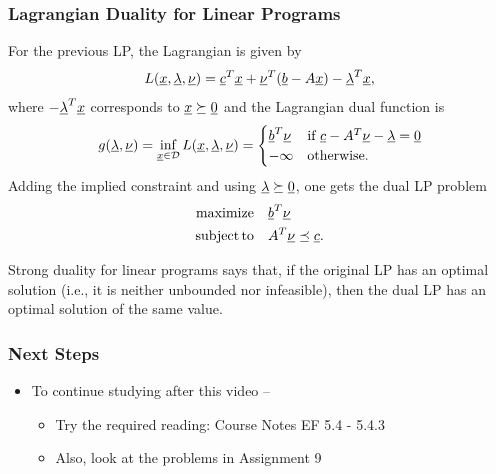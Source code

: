 \documentclass[10pt,english,aspectratio=169]{beamer}
\begin{document}
\begin{frame} \frametitle{Lagrangian Duality for Linear Programs}

For the previous LP, the Lagrangian is given by
	\[ L(\underline{x},\underline{\lambda},\underline{\nu}) = \underline{c}^T \underline{x} + \underline{\nu}^T (\underline{b} - A\underline{x}) - \underline{\lambda}^T \underline{x}, \]
	where $-\underline{\lambda}^T \underline{x}$ corresponds to $\underline{x} \succeq \underline{0}$ and the Lagrangian dual function is \vspace{-1.5mm}
\begin{equation*}
g(\underline{\lambda},\underline{\nu})
= \inf_{\underline{x}\in \mathcal{D}} L(\underline{x},\underline{\lambda},\underline{\nu})
	= \begin{cases} \underline{b}^T \underline{\nu} & \text{if } \underline{c} - A^T \underline{\nu} - \underline{\lambda} = \underline{0} \\
-\infty & \text{otherwise}. \end{cases}
\end{equation*}
Adding the implied constraint and using $\underline{\lambda} \succeq \underline{0}$, one gets the dual LP problem
\begin{align*}
\mathrm{maximize} \quad & \underline{b}^T \underline{\nu} \\
	\mathrm{subject\,to} \quad & A^T \underline{\nu} \preceq \underline{c}.
\end{align*}

\vspace{1mm}
Strong duality for linear programs says that, if the original LP has an optimal solution (i.e., it is neither unbounded nor infeasible), then the dual LP has an optimal solution of the same value.

\end{frame}

\begin{frame} \frametitle{Next Steps}

\begin{itemize}
\setlength\itemsep{5mm}
\item To continue studying after this video -- \vspace{2mm}

\begin{itemize}
 \setlength\itemsep{3mm}
 
 \item Try the required reading:  Course Notes EF 5.4 - 5.4.3

 \item Also, look at the problems in Assignment 9
\end{itemize}
\end{itemize}


\end{frame}
\end{document}

